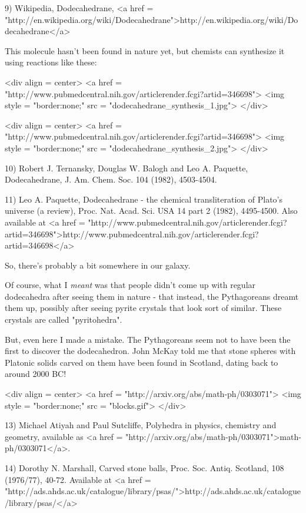 9) Wikipedia, Dodecahedrane, <a href = "http://en.wikipedia.org/wiki/Dodecahedrane">http://en.wikipedia.org/wiki/Dodecahedrane</a>

This molecule hasn't been found in nature yet, but chemists can 
synthesize it using reactions like these:

<div align = center>
<a href = "http://www.pubmedcentral.nih.gov/articlerender.fcgi?artid=346698">
<img style = "border:none;" src = "dodecahedrane_synthesis_1.jpg">
</div>

<div align = center>
<a href = "http://www.pubmedcentral.nih.gov/articlerender.fcgi?artid=346698">
<img style = "border:none;" src = "dodecahedrane_synthesis_2.jpg">
</div>

10) Robert J. Ternansky, Douglas W. Balogh and Leo A. Paquette, 
Dodecahedrane, J. Am. Chem. Soc. 104 (1982), 4503-4504.

11) Leo A. Paquette, Dodecahedrane - the chemical transliteration of 
Plato's universe (a review), Proc. Nat. Acad. Sci. USA 14 part 2 
(1982), 4495-4500.  Also available at
<a href = "http://www.pubmedcentral.nih.gov/articlerender.fcgi?artid=346698">http://www.pubmedcentral.nih.gov/articlerender.fcgi?artid=346698</a>

So, there's probably a bit somewhere in our galaxy.  

Of course, what I \emph{meant} was that people didn't come up with 
regular dodecahedra after seeing them in nature - that instead, 
the Pythagoreans dreamt them up, possibly after seeing pyrite 
crystals that look sort of similar.  These crystals are called 
"pyritohedra".  

But, even here I made a mistake.   The Pythagoreans seem not to have been 
the first to discover the dodecahedron.  John McKay told me that
stone spheres with Platonic solids carved on them have been found
in Scotland, dating back to around 2000 BC!  

<div align = center>
<a href = "http://arxiv.org/abs/math-ph/0303071">
<img style = "border:none;" src = "blocks.gif">
</div>


13) Michael Atiyah and Paul Sutcliffe, Polyhedra in physics, chemistry
and geometry, available as <a href = "http://arxiv.org/abs/math-ph/0303071">math-ph/0303071</a>.

14) Dorothy N. Marshall, Carved stone balls, Proc. Soc. Antiq. 
Scotland, 108 (1976/77), 40-72.  Available at
<a href = "http://ads.ahds.ac.uk/catalogue/library/psas/">http://ads.ahds.ac.uk/catalogue/library/psas/</a>

